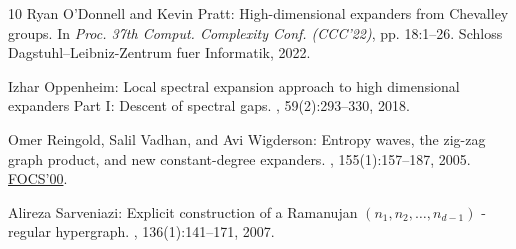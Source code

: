 \documentclass[11pt]{article}
\begin{document}
\begin{thebibliography}{10}
{\sc Ryan O'Donnell and Kevin Pratt}: High-dimensional expanders from
  {C}hevalley groups.
\newblock In {\em Proc. 37th Comput. Complexity Conf. (CCC'22)}, pp. 18:1--26.
  Schloss Dagstuhl--Leibniz-Zentrum fuer Informatik, 2022.

{\sc Izhar Oppenheim}: Local spectral expansion approach to high dimensional
  expanders {P}art {I}: {D}escent of spectral gaps.
, 59(2):293--330, 2018.

{\sc Omer Reingold, Salil Vadhan, and Avi Wigderson}: Entropy waves, the
  zig-zag graph product, and new constant-degree expanders.
, 155(1):157--187, 2005.
\newblock \prelim \href{https://doi.org/10.1109/SFCS.2000.892006}{FOCS'00}.

{\sc Alireza Sarveniazi}: Explicit construction of a {R}amanujan
  $(n_1,n_2,\ldots,n_{d-1})$ -regular hypergraph.
, 136(1):141--171, 2007.
\newblock [\epfmtdoi{10.1215/S0012-7094-07-13913-9}]

\end{thebibliography}
\end{document}
